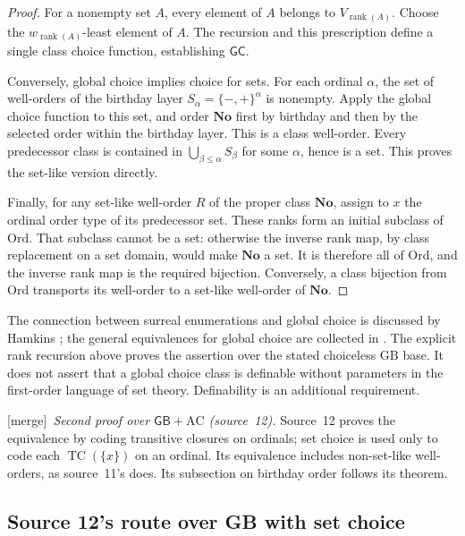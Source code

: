 \documentclass[11pt]{article}
\theoremstyle{definition}
\theoremstyle{remark}
\newcommand{\No}{\mathbf{No}}
\newcommand{\Ord}{\mathrm{Ord}}
\newcommand{\rk}{\operatorname{rank}}
\newcommand{\GB}{\mathsf{GB}}
\newcommand{\GC}{\mathsf{GC}}
\newcommand{\merge}{\textsf{[merge]}}
\begin{document}
\begin{proof}
For a nonempty set \(A\), every element of \(A\) belongs to
\(V_{\rk(A)}\).  Choose the \(w_{\rk(A)}\)-least element of \(A\).
The recursion and this prescription define a single class choice function,
establishing \(\GC\).

Conversely, global choice implies choice for sets.  For each ordinal
\(\alpha\), the set of well-orders of the birthday layer
\(S_\alpha=\{-,+\}^{\alpha}\) is nonempty.  Apply the global choice
function to this set, and order \(\No\) first by birthday and then by the
selected order within the birthday layer.  This is a class well-order.
Every predecessor class is contained in
\(\bigcup_{\beta\leq\alpha}S_\beta\) for some \(\alpha\), hence is a
set.  This proves the set-like version directly.

Finally, for any set-like well-order \(R\) of the proper class \(\No\),
assign to \(x\) the ordinal order type of its predecessor set.  These ranks
form an initial subclass of \(\Ord\).  That subclass cannot be a set:
otherwise the inverse rank map, by class replacement on a set domain, would
make \(\No\) a set.  It is therefore all of \(\Ord\), and the inverse
rank map is the required bijection.  Conversely, a class bijection from
\(\Ord\) transports its well-order to a set-like well-order of \(\No\).
\end{proof}

The connection between surreal enumerations and global choice is discussed
by Hamkins \cite{HamkinsChoice}; the general equivalences for global choice
are collected in \cite{HamkinsGC}.  The explicit rank recursion above proves
the assertion over the stated choiceless GB base.  It does not assert that a
global choice class is definable without parameters in the first-order
language of set theory.  Definability is an additional requirement.


\merge\ \emph{Second proof over $\GB+\mathrm{AC}$ (source~12).} Source~12
proves the equivalence by coding transitive closures on ordinals; set choice
is used only to code each $\operatorname{TC}(\{x\})$ on an ordinal. Its
equivalence includes non-set-like well-orders, as source~11's does. Its
subsection on birthday order follows its theorem.

\subsection{Source 12's route over GB with set choice}
\label{swo:st:sec:choice}
\end{document}

